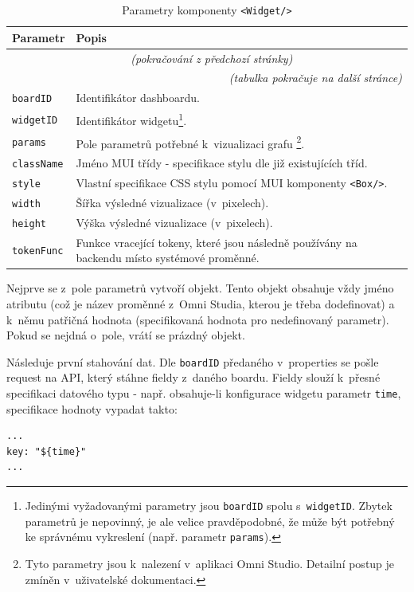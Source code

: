 \documentclass[czech, bc, kiv, he, iso690numb]{fasthesis}
\begin{document}
	\begin{longtable}{p{}p{}}
	\caption{Parametry komponenty \texttt{<Widget/>}}
	\label{tab:widgetProps}\\
	\toprule[1.5pt]
	\textbf{Parametr} & \textbf{Popis}\\
	\midrule
	\endfirsthead
	\multicolumn{2}{c}{\tablename{}~\thetable{} \textit{(pokračování z předchozí stránky)}}\\
	\endhead
	\midrule
	\multicolumn{2}{r}{\textit{(tabulka pokračuje na další stránce)}}\\
	\endfoot
	\bottomrule[1.5pt]
	\endlastfoot
	\verb"boardID" & Identifikátor dashboardu.  \\
	\midrule
	\verb"widgetID" & Identifikátor widgetu\footnote{Jedinými vyžadovanými parametry jsou \texttt{boardID} spolu s~\texttt{widgetID}. Zbytek parametrů je nepovinný, je ale velice pravděpodobné, že může být potřebný ke správnému vykreslení (např. parametr \texttt{params}).}. \\
	\midrule
	\verb"params" & Pole parametrů potřebné k~vizualizaci grafu \footnote{Tyto parametry jsou k~nalezení v~aplikaci Omni Studio. Detailní postup je zmíněn v~uživatelské dokumentaci.}. \\
	\midrule
	\verb"className" & Jméno MUI třídy - specifikace stylu dle již existujících tříd. \\
	\midrule
	\verb"style" & Vlastní specifikace CSS stylu pomocí MUI komponenty \texttt{<Box/>}. \\
	\midrule
	\verb"width" & Šířka výsledné vizualizace (v~pixelech). \\
	\midrule
	\verb"height" & Výška výsledné vizualizace (v~pixelech). \\
	\midrule
	\verb"tokenFunc" & Funkce vracející tokeny, které jsou následně používány na backendu místo systémové proměnné. \\
	\end{longtable}

Nejprve se z~pole parametrů vytvoří objekt. Tento objekt obsahuje vždy jméno atributu (což je název proměnné z~Omni Studia, kterou je třeba dodefinovat) a k~němu patřičná hodnota (specifikovaná
hodnota pro nedefinovaný parametr). Pokud se nejdná o~pole, vrátí se prázdný objekt.

Následuje první stahování dat. Dle \texttt{boardID} předaného v~properties se pošle request na API, který stáhne fieldy z~daného boardu. Fieldy slouží k~přesné specifikaci datového typu - např.
obsahuje-li konfigurace widgetu parametr \texttt{time}, specifikace hodnoty vypadat takto:
\lstset{style=plainsrc}
\begin{lstlisting}
...
key: "${time}"
...
\end{lstlisting}
\end{document}
